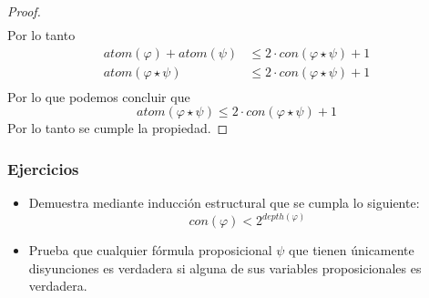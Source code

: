 \documentclass[a4paper]{article}
\begin{document}
\begin{proof}
\begin{align*}
    \end{align*}
    Por lo tanto
    \begin{align*}
        atom\left(\varphi\right) + atom\left(\psi\right) &\leq 2 \cdot con\left(\varphi \star \psi\right) + 1 \\
        atom\left(\varphi \star \psi\right) &\leq 2 \cdot con\left(\varphi \star \psi\right) + 1 \\
    \end{align*}
    Por lo que podemos concluir que
    \[
        atom\left(\varphi \star \psi\right) \leq 2 \cdot con\left(\varphi \star \psi\right) + 1
    \]
    Por lo tanto se cumple la propiedad.
\end{proof}
\subsubsection{Ejercicios}
\noindent
\begin{itemize}
    \item Demuestra mediante inducción estructural que se cumpla lo siguiente:
    \[
        con\left(\varphi\right) < 2^{depth\left(\varphi\right)}
    \]
    \item Prueba que cualquier fórmula proposicional \(\psi\) que tienen únicamente disyunciones
    es verdadera si alguna de sus variables proposicionales es verdadera.
\end{itemize}
\end{document}
